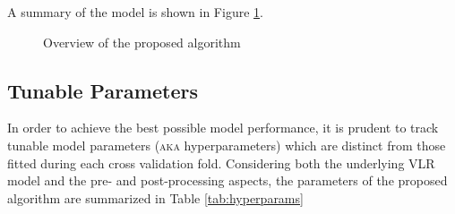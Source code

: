 A summary of the model is shown in Figure \ref{f2:modelsum}.
\begin{figure}
  \centering\scalebox{0.65}{}
  \caption{Overview of the proposed algorithm}
  \label{f2:modelsum}
\end{figure}
\subsection{Tunable Parameters}
In order to achieve the best possible model performance, it is prudent to track tunable model parameters (\textsc{aka} hyperparameters) which are distinct from those fitted during each cross validation fold. Considering both the underlying VLR model and the pre- and post-processing aspects, the parameters of the proposed algorithm are summarized in Table \ref{tab:hyperparams}
